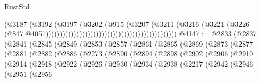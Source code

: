 \begin{lexlean}{RustStd}
\begin{coremodule}
{\begin{coremodule}
{{{{{{{{{{{{{{{{{{{{{{{{{{{{{{{{{{{{{{{{{{{{{{{{{{{{{{{                                                                            (@3187
                                                                              (@3192
                                                                                (@3197
                                                                                  (@3202
                                                                                    (@915
                                                                                      (@3207
                                                                                        (@3211
                                                                                          (@3216
                                                                                            (@3221
                                                                                              (@3226
                                                                                                (@847
                                                                                                  @4051)))))))))))))))))))))))))))))))))))))))))))))))
@4147 := @2833
    (@2837
      (@2841
        (@2845
          (@2849
            (@2853
              (@2857
                (@2861
                  (@2865
                    (@2869
                      (@2873
                        (@2877
                          (@2881
                            (@2882
                              (@2886
                                (@2273
                                  (@2890
                                    (@2894
                                      (@2898
                                        (@2902
                                          (@2906
                                            (@2910
                                              (@2914
                                                (@2918
                                                  (@2922
                                                    (@2926
                                                      (@2930
                                                        (@2934
                                                          (@2938
                                                            (@2217
                                                              (@2942
                                                                (@2946
                                                                  (@2951
                                                                    (@2956
}}}}}}}}}}}}}}}}}}}}}}}}}}}}}}}}}}}}}}}}}}}}}}}}}}}}}}}
\end{coremodule}}
\end{coremodule}
\end{lexlean}
